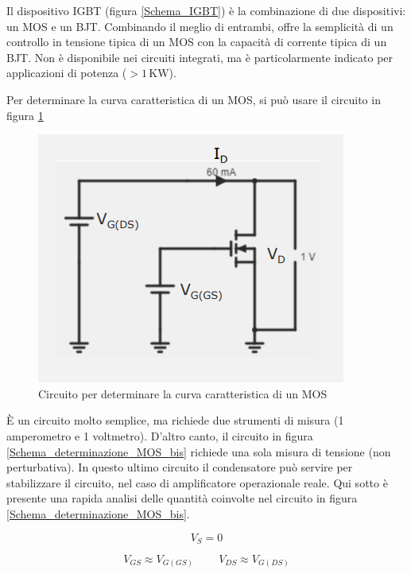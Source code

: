 \documentclass{article}
\begin{document}
Il dispositivo IGBT (figura \ref{Schema_IGBT}) è la combinazione di due dispositivi: un MOS e un BJT. Combinando il meglio di entrambi, offre la semplicità di un controllo in tensione tipica di un MOS con la capacità di corrente tipica di un BJT. Non è disponibile nei circuiti integrati, ma è particolarmente indicato per applicazioni di potenza ($> 1 \,\textrm{KW}$).

\vspace{3mm}

Per determinare la curva caratteristica di un MOS, si può usare il circuito in figura \ref{Schema_determinazione_MOS}

\begin{figure}[h]
  \centering
  \includegraphics[scale=0.55]{IM_determinazione_MOS}
  \caption{Circuito per determinare la curva caratteristica di un MOS}
  \label{Schema_determinazione_MOS}
\end{figure}

È un circuito molto semplice, ma richiede due strumenti di misura (1 amperometro e 1 voltmetro). D'altro canto, il circuito in figura \ref{Schema_determinazione_MOS_bis} richiede una sola misura di tensione (non perturbativa). In questo ultimo circuito il condensatore può servire per stabilizzare il circuito, nel caso di amplificatore operazionale reale. Qui sotto è presente una rapida analisi delle quantità coinvolte nel circuito in figura \ref{Schema_determinazione_MOS_bis}.

\[V_S = 0\]

\[V_{GS} \approx V_{G(GS)} \;\;\;\;\;\;\;\; V_{DS} \approx V_{G(DS)}\]
\end{document}
